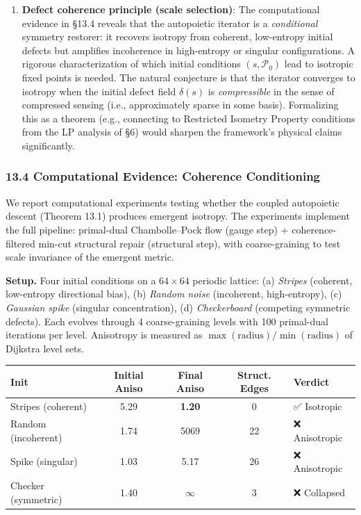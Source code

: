 \documentclass[
]{article}
\begin{document}
\begin{enumerate}
  lengths, recovering Regge calculus?
\item
  \textbf{Defect coherence principle (scale selection)}: The
  computational evidence in §13.4 reveals that the autopoietic iterator
  is a \emph{conditional} symmetry restorer: it recovers isotropy from
  coherent, low-entropy initial defects but amplifies incoherence in
  high-entropy or singular configurations. A rigorous characterization
  of which initial conditions \((s, \mathcal{P}_0)\) lead to isotropic
  fixed points is needed. The natural conjecture is that the iterator
  converges to isotropy when the initial defect field \(\delta(s)\) is
  \emph{compressible} in the sense of compressed sensing (i.e.,
  approximately sparse in some basis). Formalizing this as a theorem
  (e.g., connecting to Restricted Isometry Property conditions from the
  LP analysis of §6) would sharpen the framework's physical claims
  significantly.
\end{enumerate}

\subsubsection{13.4 Computational Evidence: Coherence
Conditioning}\label{computational-evidence-coherence-conditioning}

We report computational experiments testing whether the coupled
autopoietic descent (Theorem 13.1) produces emergent isotropy. The
experiments implement the full pipeline: primal-dual Chambolle--Pock
flow (gauge step) + coherence-filtered min-cut structural repair
(structural step), with coarse-graining to test scale invariance of the
emergent metric.

\textbf{Setup.} Four initial conditions on a \(64 \times 64\) periodic
lattice: (a) \emph{Stripes} (coherent, low-entropy directional bias),
(b) \emph{Random noise} (incoherent, high-entropy), (c) \emph{Gaussian
spike} (singular concentration), (d) \emph{Checkerboard} (competing
symmetric defects). Each evolves through 4 coarse-graining levels with
100 primal-dual iterations per level. Anisotropy is measured as
\(\max(\text{radius}) / \min(\text{radius})\) of Dijkstra level sets.

\begin{longtable}[]{@{}lcccl@{}}
\toprule\noalign{}
Init & Initial Aniso & Final Aniso & Struct. Edges & Verdict \\
\midrule\noalign{}
\endhead
\bottomrule\noalign{}
\endlastfoot
Stripes (coherent) & 5.29 & \textbf{1.20} & 0 & ✅ Isotropic \\
Random (incoherent) & 1.74 & 5069 & 22 & ❌ Anisotropic \\
Spike (singular) & 1.03 & 5.17 & 26 & ❌ Anisotropic \\
Checker (symmetric) & 1.40 & \(\infty\) & 3 & ❌ Collapsed \\
\end{longtable}
\end{document}
